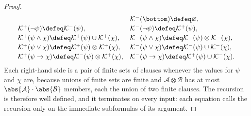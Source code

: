 \begin{proof}
\[\begin{array}{lll}
 &\mathcal K^{-}(\bottom)\defeq\varnothing,\\[2pt]
 \mathcal K^{+}(\neg\psi)\defeq\mathcal K^{-}(\psi),
 &\mathcal K^{-}(\neg\psi)\defeq\mathcal K^{+}(\psi),\\[2pt]
 \mathcal K^{+}(\psi\land\chi)\defeq
   \mathcal K^{+}(\psi)\cup\mathcal K^{+}(\chi),
 &\mathcal K^{-}(\psi\land\chi)\defeq
   \mathcal K^{-}(\psi)\otimes\mathcal K^{-}(\chi),\\[2pt]
 \mathcal K^{+}(\psi\lor\chi)\defeq
   \mathcal K^{+}(\psi)\otimes\mathcal K^{+}(\chi),
 &\mathcal K^{-}(\psi\lor\chi)\defeq
   \mathcal K^{-}(\psi)\cup\mathcal K^{-}(\chi),\\[2pt]
 \mathcal K^{+}(\psi\to\chi)\defeq
   \mathcal K^{-}(\psi)\otimes\mathcal K^{+}(\chi),
 &\mathcal K^{-}(\psi\to\chi)\defeq
   \mathcal K^{+}(\psi)\cup\mathcal K^{-}(\chi).
\end{array}
\]
Each right-hand side is a pair of finite sets of clauses whenever the
values for \(\psi\) and \(\chi\) are, because unions of finite sets are
finite and \(\mathcal A\otimes\mathcal B\) has at most
\(\abs{\mathcal A}\cdot\abs{\mathcal B}\) members, each the union of two
finite clauses.  The recursion is therefore well defined, and it
terminates on every input: each equation calls the recursion only on the
immediate subformulas of its argument.


\end{proof}

